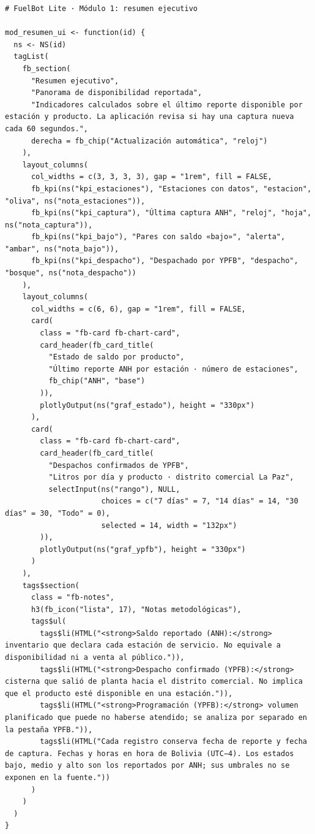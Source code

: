 \begin{lstlisting}[style=anexoR]
# FuelBot Lite · Módulo 1: resumen ejecutivo

mod_resumen_ui <- function(id) {
  ns <- NS(id)
  tagList(
    fb_section(
      "Resumen ejecutivo",
      "Panorama de disponibilidad reportada",
      "Indicadores calculados sobre el último reporte disponible por estación y producto. La aplicación revisa si hay una captura nueva cada 60 segundos.",
      derecha = fb_chip("Actualización automática", "reloj")
    ),
    layout_columns(
      col_widths = c(3, 3, 3, 3), gap = "1rem", fill = FALSE,
      fb_kpi(ns("kpi_estaciones"), "Estaciones con datos", "estacion", "oliva", ns("nota_estaciones")),
      fb_kpi(ns("kpi_captura"), "Última captura ANH", "reloj", "hoja", ns("nota_captura")),
      fb_kpi(ns("kpi_bajo"), "Pares con saldo «bajo»", "alerta", "ambar", ns("nota_bajo")),
      fb_kpi(ns("kpi_despacho"), "Despachado por YPFB", "despacho", "bosque", ns("nota_despacho"))
    ),
    layout_columns(
      col_widths = c(6, 6), gap = "1rem", fill = FALSE,
      card(
        class = "fb-card fb-chart-card",
        card_header(fb_card_title(
          "Estado de saldo por producto",
          "Último reporte ANH por estación · número de estaciones",
          fb_chip("ANH", "base")
        )),
        plotlyOutput(ns("graf_estado"), height = "330px")
      ),
      card(
        class = "fb-card fb-chart-card",
        card_header(fb_card_title(
          "Despachos confirmados de YPFB",
          "Litros por día y producto · distrito comercial La Paz",
          selectInput(ns("rango"), NULL,
                      choices = c("7 días" = 7, "14 días" = 14, "30 días" = 30, "Todo" = 0),
                      selected = 14, width = "132px")
        )),
        plotlyOutput(ns("graf_ypfb"), height = "330px")
      )
    ),
    tags$section(
      class = "fb-notes",
      h3(fb_icon("lista", 17), "Notas metodológicas"),
      tags$ul(
        tags$li(HTML("<strong>Saldo reportado (ANH):</strong> inventario que declara cada estación de servicio. No equivale a disponibilidad ni a venta al público.")),
        tags$li(HTML("<strong>Despacho confirmado (YPFB):</strong> cisterna que salió de planta hacia el distrito comercial. No implica que el producto esté disponible en una estación.")),
        tags$li(HTML("<strong>Programación (YPFB):</strong> volumen planificado que puede no haberse atendido; se analiza por separado en la pestaña YPFB.")),
        tags$li(HTML("Cada registro conserva fecha de reporte y fecha de captura. Fechas y horas en hora de Bolivia (UTC−4). Los estados bajo, medio y alto son los reportados por ANH; sus umbrales no se exponen en la fuente."))
      )
    )
  )
}


\end{lstlisting}

